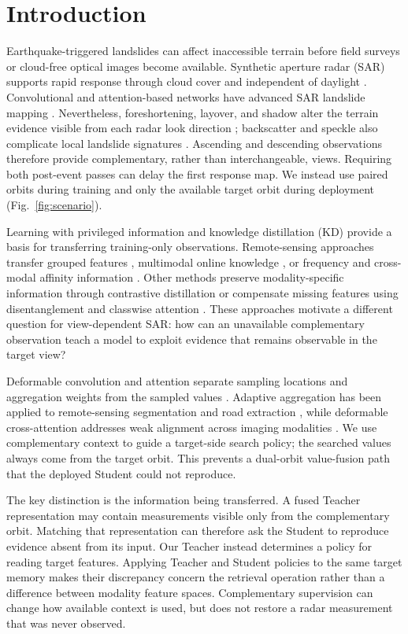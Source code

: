 \section{Introduction}
\label{sec:introduction}
Earthquake-triggered landslides can affect inaccessible terrain before field surveys or cloud-free optical images become available. Synthetic aperture radar (SAR) supports rapid response through cloud cover and independent of daylight \cite{Mondini2021,Handwerger2022,Amatya2023}. Convolutional and attention-based networks have advanced SAR landslide mapping \cite{Nava2022DL,Nava2022Attention,Boehm2022,Chen2024MFEWF}. Nevertheless, foreshortening, layover, and shadow alter the terrain evidence visible from each radar look direction \cite{Shi2024}; backscatter and speckle also complicate local landslide signatures \cite{Santangelo2022}. Ascending and descending observations therefore provide complementary, rather than interchangeable, views. Requiring both post-event passes can delay the first response map. We instead use paired orbits during training and only the available target orbit during deployment (Fig.~\ref{fig:scenario}).

Learning with privileged information \cite{LopezPaz2016} and knowledge distillation (KD) \cite{Hinton2015} provide a basis for transferring training-only observations. Remote-sensing approaches transfer grouped features \cite{Li2022}, multimodal online knowledge \cite{Liu2024}, or frequency and cross-modal affinity information \cite{Sun2027}. Other methods preserve modality-specific information through contrastive distillation \cite{Sikdar2025} or compensate missing features using disentanglement and classwise attention \cite{Kieu2026DIS2}. These approaches motivate a different question for view-dependent SAR: how can an unavailable complementary observation teach a model to exploit evidence that remains observable in the target view?

Deformable convolution and attention separate sampling locations and aggregation weights from the sampled values \cite{Dai2017,Zhu2021}. Adaptive aggregation has been applied to remote-sensing segmentation and road extraction \cite{Zuo2022,Dai2023}, while deformable cross-attention addresses weak alignment across imaging modalities \cite{Hu2025}. We use complementary context to guide a target-side search policy; the searched values always come from the target orbit. This prevents a dual-orbit value-fusion path that the deployed Student could not reproduce.

The key distinction is the information being transferred. A fused Teacher representation may contain measurements visible only from the complementary orbit. Matching that representation can therefore ask the Student to reproduce evidence absent from its input. Our Teacher instead determines a policy for reading target features. Applying Teacher and Student policies to the same target memory makes their discrepancy concern the retrieval operation rather than a difference between modality feature spaces. Complementary supervision can change how available context is used, but does not restore a radar measurement that was never observed.


